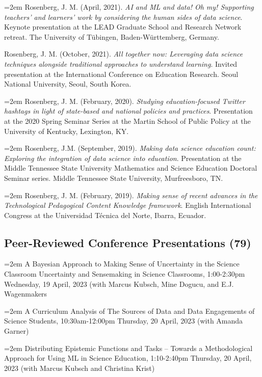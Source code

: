 \documentclass[
  14,
]{article}
\begin{document}
\hangindent=2em Rosenberg, J. M. (April, 2021). \emph{AI and ML and
data! Oh my! Supporting teachers' and learners' work by considering the
human sides of data science}. Keynote presentation at the LEAD Graduate
School and Research Network retreat. The University of Tübingen,
Baden-Württemberg, Germany.

Rosenberg, J. M. (October, 2021). \emph{All together now: Leveraging
data science techniques alongside traditional approaches to understand
learning}. Invited presentation at the International Conference on
Education Research. Seoul National University, Seoul, South Korea.

\hangindent=2em Rosenberg, J. M. (February, 2020). \emph{Studying
education-focused Twitter hashtags in light of state-based and national
policies and practices}. Presentation at the 2020 Spring Seminar Series
at the Martin School of Public Policy at the University of Kentucky,
Lexington, KY.

\hangindent=2em Rosenberg, J.M. (September, 2019). \emph{Making data
science education count: Exploring the integration of data science into
education}. Presentation at the Middle Tennessee State University
Mathematics and Science Education Doctoral Seminar series. Middle
Tennessee State University, Murfreesboro, TN.

\hangindent=2em Rosenberg, J. M. (February, 2019). \emph{Making sense of
recent advances in the Technological Pedagogical Content Knowledge
framework}. English International Congress at the Universidad Técnica
del Norte, Ibarra, Ecuador.

\hypertarget{peer-reviewed-conference-presentations-79}{%
\subsection{Peer-Reviewed Conference Presentations
(79)}\label{peer-reviewed-conference-presentations-79}}

\hangindent=2em A Bayesian Approach to Making Sense of Uncertainty in
the Science Classroom Uncertainty and Sensemaking in Science Classrooms,
1:00-2:30pm Wednesday, 19 April, 2023 (with Marcus Kubsch, Mine Dogucu,
and E.J. Wagenmakers

\hangindent=2em A Curriculum Analysis of The Sources of Data and Data
Engagements of Science Students, 10:30am-12:00pm Thursday, 20 April,
2023 (with Amanda Garner)

\hangindent=2em Distributing Epistemic Functions and Tasks -- Towards a
Methodological Approach for Using ML in Science Education, 1:10-2:40pm
Thursday, 20 April, 2023 (with Marcus Kubsch and Christina Krist)
\end{document}
